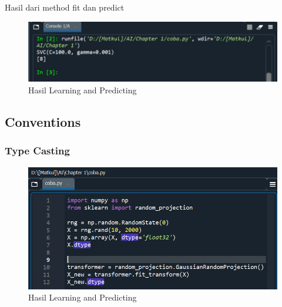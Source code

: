 \par Hasil dari method fit dan predict

    \begin{figure}[H]
    \centering
    \includegraphics[width=13cm]{figures/chapter1/13.PNG}
    \caption{Hasil Learning and Predicting}
    \end{figure}

\subsection{Conventions}

\subsubsection{Type Casting}

    \begin{figure}[H]
    \centering
    \includegraphics[width=13cm]{figures/chapter1/15.PNG}
    \caption{Hasil Learning and Predicting}
    \end{figure}
    
